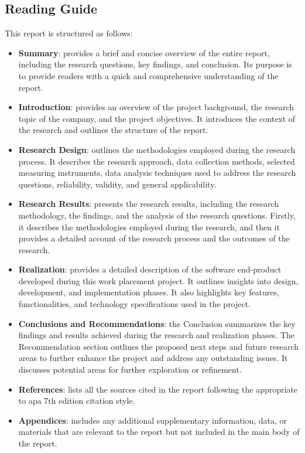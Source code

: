 \begin{multicols}{2}
      \section{Reading Guide}
      This report is structured as follows:
      \begin{itemize}
            \item \textbf{Summary}: provides a brief and concise overview of the entire report, including the
                  research questions, key findings, and conclusion. Its purpose is to provide readers with a
                  quick and comprehensive understanding of the report.
            \item \textbf{Introduction}: provides an overview of the project background, the research topic of the
                  company, and the project objectives. It introduces the context of the research and outlines the
                  structure of the report.
            \item \textbf{Research Design}: outlines the methodologies employed during the research
                  process. It describes the research approach, data collection methods, selected measuring instruments,
                  data analysis techniques used to address the research questions, reliability, validity, and general
                  applicability.
            \item \textbf{Research Results}: presents the research results, including the research methodology, the findings,
                  and the analysis of the research questions. Firstly, it describes the methodologies employed
                  during the research, and then it provides a detailed account of the research process and the
                  outcomes of the research.
            \item \textbf{Realization}: provides a detailed description of the software end-product developed during
                  this work placement project. It outlines insights into design, development, and implementation
                  phases. It also highlights key features, functionalities, and technology specifications used in
                  the project.
            \item \textbf{Conclusions and Recommendations}: the Conclusion summarizes the key findings and results
                  achieved during the research and realization phases. The Recommendation section outlines the
                  proposed next steps and future research areas to further enhance the project and address any
                  outstanding issues. It discusses potential areas for further exploration or refinement.
            \item \textbf{References}: lists all the sources cited in the report following the appropriate to
                  \acrshort{apa} 7th edition citation style.
            \item \textbf{Appendices}: includes any additional supplementary information, data, or materials that
                  are relevant to the report but not included in the main body of the report.
      \end{itemize}


\end{multicols}
